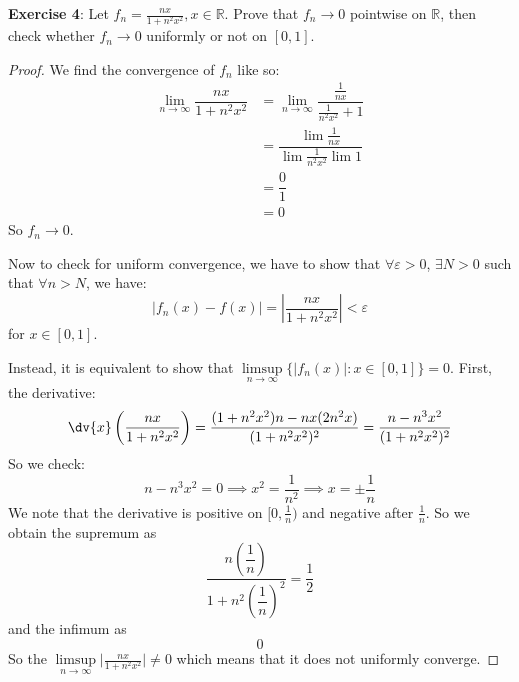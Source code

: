 \documentclass{article}
\begin{document}
\textbf{Exercise 4}: Let $f_{n} = \frac{nx}{1 + n^{2} x^{2}}, x \in \mathbb{R}$. Prove that $f_{n} \rightarrow 0$ pointwise on $\mathbb{R}$, then check whether $f_{n} \rightarrow 0$ uniformly or not on $[0, 1]$.
    \begin{proof}
        We find the convergence of $f_{n}$ like so:
            \begin{align*}
                \lim\limits_{n \to  \infty}\dfrac{nx}{1 + n^{2}x^{2}} &= \lim\limits_{n \to \infty}\dfrac{\frac{1}{nx}}{\frac{1}{n^{2}x^{2}} + 1} \\
                                                                      &= \dfrac{\lim \frac{1}{nx}}{\lim \frac{1}{n^{2}x^{2}}\lim 1}               \\
                                                                      &= \dfrac{0}{1}                                                             \\
                                                                      &= 0                                                                          
            \end{align*}
        So $f_{n}\rightarrow 0$. 

        Now to check for uniform convergence, we have to show that $\forall \varepsilon > 0$, $\exists N > 0$ such that $\forall n > N$, we have:
            \begin{equation*}
                \lvert f_{n}(x) - f(x) \rvert = \left\lvert \dfrac{nx}{1 + n^{2}x^{2}} \right\rvert < \varepsilon
            \end{equation*}
        for $x \in [0, 1]$.

        Instead, it is equivalent to show that $\limsup\limits_{n \to \infty} \{\lvert f_{n}(x) \rvert : x \in [0, 1]\} = 0$. First, the derivative:
            \begin{equation*}
                \dv{x}\left(\dfrac{nx}{1 + n^{2}x^{2}}\right) = \dfrac{(1 + n^{2}x^{2})n - nx(2n^{2}x)}{(1 + n^{2}x^{2})^{2}} = \dfrac{n - n^{3}x^{2}}{(1 + n^{2}x^{2})^{2}}
            \end{equation*}
        So we check:
            \begin{equation*}
                n - n^{3}x^{2} = 0 \implies x^{2} = \dfrac{1}{n^{2}} \implies x = \pm \dfrac{1}{n}
            \end{equation*}
        We note that the derivative is positive on $[0, \frac{1}{n})$ and negative after $\frac{1}{n}$. So we obtain the supremum as 
            \begin{equation*}
                \dfrac{n\left(\dfrac{1}{n}\right)}{1 + n^{2}\left(\dfrac{1}{n}\right)^{2}} = \dfrac{1}{2}
            \end{equation*}
        and the infimum as 
            \begin{equation*}
                0
            \end{equation*}
        So the $ \limsup\limits_{n \to \infty} \lvert \frac{nx}{1 + n^{2}x^{2}} \rvert \neq 0$ which means that it does not uniformly converge.
    \end{proof}
\end{document}

